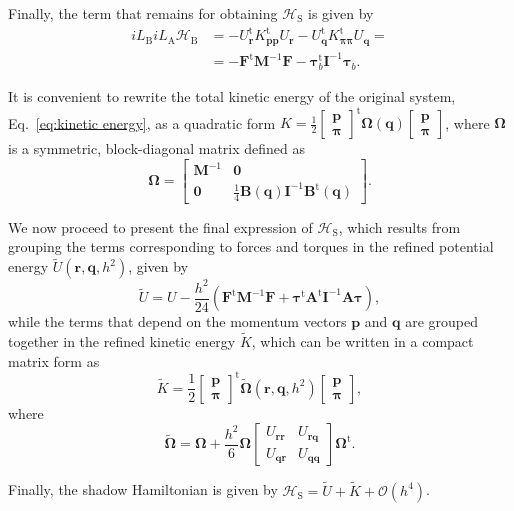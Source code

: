 \documentclass[
	aip,
	jcp,
	reprint,
]{revtex4-1}
\newcommand{\mt}[1]{\boldsymbol{\mathbf{#1}}}          %
\newcommand{\vt}[1]{\boldsymbol{\mathbf{#1}}}          %
\newcommand{\tr}[1]{#1^\text{t}}                       %
\newcommand{\Ham}[1]{{\mathcal H}_\text{#1}}           %
\newcommand{\Liu}[1]{i\!L_\text{#1}}                   %
\newcommand{\timestep}{h}
\newcommand{\refined}[1]{\widetilde{#1}}
\begin{document}
Finally, the term that remains for obtaining $\Ham{S}$ is given by
\begin{align*}
\Liu B \Liu A \Ham B &= -\tr{U_{\vt r}} \tr{K_{\vt p \vt p}} U_{\vt r} - \tr{U_{\vt q}} \tr{K_{\vt \pi \vt \pi}} U_{\vt q} = \\
&= -\tr{\vt F} {\mt M}^{-1} {\vt F} - \tr{\vt \tau}_b {\mt I}^{-1} {\vt \tau}_b.
\end{align*}

It is convenient to rewrite the total kinetic energy of the original system, Eq.~\eqref{eq:kinetic energy}, as a quadratic form $K = \frac{1}{2}\tr{[\substack{\vt p \\ \vt \pi}]} {\mt \Omega}(\vt q) [\substack{\vt p \\ \vt \pi}]$, where $\mt \Omega$ is a symmetric, block-diagonal matrix defined as
\begin{equation}
\label{eq:block-diagonal inverse mass tensor}
{\mt \Omega} = \left[\begin{array}{cc}
{\mt M}^{-1} & \mt 0 \\
\mt 0 & \frac{1}{4} {\mt B}(\vt q) {\mt I}^{-1} \tr{\mt B}(\vt q)
\end{array}\right].
\end{equation}

We now proceed to present the final expression of $\Ham{S}$, which results from grouping the terms corresponding to forces and torques in the refined potential energy $\refined U(\vt r, \vt q, h^2)$, given by
\begin{equation*}
\refined U = U - \frac{\timestep^2}{24} \left( \tr{\vt F} {\mt M}^{-1} {\vt F} + \tr{\vt \tau} \tr{\mt A} {\mt I}^{-1} {\mt A} {\vt \tau} \right),
\end{equation*}
while the terms that depend on the momentum vectors $\vt p$ and $\vt q$ are grouped together in the refined kinetic energy $\refined K$, which can be written in a compact matrix form as
\begin{equation*}
\refined K = \frac{1}{2} \tr{ \left[\begin{array}{c} \vt p \\ \vt \pi \end{array}\right]} \refined{\mathbf \Omega}(\vt r, \vt q, h^2) \left[\begin{array}{c} \vt p \\ \vt \pi \end{array}\right],
\end{equation*}
where
\begin{equation*}
\refined{\mt \Omega} = {\mt \Omega} + \frac{\timestep^2}{6} {\mt \Omega} \left[\begin{array}{cc}
U_{\vt r \vt r} & U_{\vt r \vt q} \\
U_{\vt q \vt r} & U_{\vt q \vt q}
\end{array}\right] \tr{\mt \Omega}.
\end{equation*}

Finally, the shadow Hamiltonian is given by $\Ham{S} = {\refined U} + {\refined K} + {\mathcal O}(\timestep^4)$.


\end{document}
